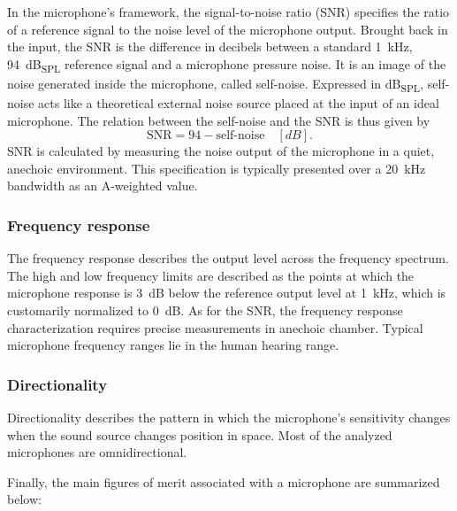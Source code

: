 \documentclass{EPL-master-thesis-covers-EN}
\newcommand{\te}[1]{\textrm{#1}}
\begin{document}
In the microphone's framework, the signal-to-noise ratio (SNR) specifies the ratio of a reference signal to the noise level of the microphone output. Brought back in the input, the SNR is the difference in decibels between a standard \SI{1}{kHz}, \SI{94}{dB_{SPL}} reference signal and a microphone pressure noise. It is an image of the noise generated inside the microphone, called self-noise. Expressed in \si{dB_{SPL}}, self-noise acts like a theoretical external noise source placed at the input of an ideal microphone. The relation between the self-noise and the SNR is thus given by
\[
 \te{SNR} = 94 - \te{self-noise} \quad \si{[dB]}.
\]
SNR is calculated by measuring the noise output of the microphone in a quiet, anechoic environment. This specification is typically presented over a \SI{20}{kHz} bandwidth as an A-weighted value.

\subsubsection*{Frequency response}

The frequency response describes the output level across the frequency spectrum. The high and low frequency limits are described as the points at which the microphone response is \SI{3}{dB} below the reference output level at \SI{1}{kHz}, which is customarily normalized to \SI{0}{dB}. As for the SNR, the frequency response characterization requires precise measurements in anechoic chamber. Typical microphone frequency ranges lie in the human hearing range.

\subsubsection*{Directionality}

Directionality describes the pattern in which the microphone’s sensitivity changes when the sound source changes position in space. Most of the analyzed microphones are omnidirectional.


Finally, the main figures of merit associated with a microphone are summarized below:
\end{document}

